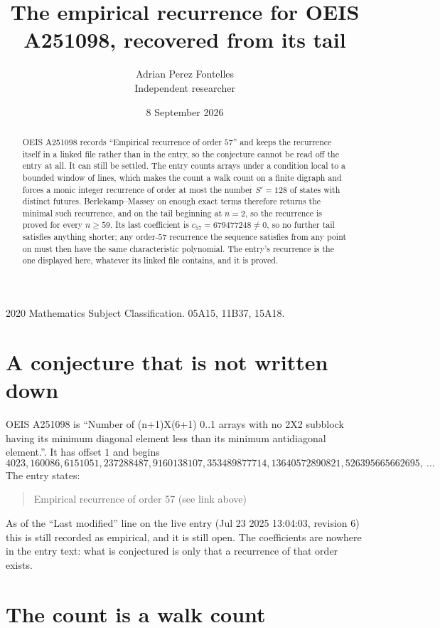 \documentclass[11pt,a4paper]{article}
\title{The empirical recurrence for OEIS A251098, recovered from its tail}
\author{Adrian Perez Fontelles\\ \small Independent researcher}
\date{8 September 2026}
\theoremstyle{plain}
\theoremstyle{definition}
\begin{document}
\maketitle

\begin{abstract}
OEIS A251098 records ``Empirical recurrence of order $57$'' and keeps the recurrence itself in
a linked file rather than in the entry, so the conjecture cannot be read off the entry at all.
It can still be settled. The entry counts arrays under a condition local to a bounded window of
lines, which makes the count a walk count on a finite digraph and forces a monic integer
recurrence of order at most the number $S'=128$ of states with distinct futures. Berlekamp--Massey on
enough exact terms therefore returns the minimal such recurrence, and on the tail beginning at $n=2$, so the recurrence is proved for every $n\ge59$.
Its last coefficient is $c_{57}=679477248\neq0$, so no further tail satisfies anything
shorter; any order-$57$ recurrence the sequence satisfies from any point on must then have
the same characteristic polynomial. The entry's recurrence is the one displayed here, whatever
its linked file contains, and it is proved.
\end{abstract}

\noindent\small 2020 Mathematics Subject Classification. 05A15, 11B37, 15A18.\normalsize

\section{A conjecture that is not written down}

OEIS A251098 is ``Number of (n+1)X(6+1) 0..1 arrays with no 2X2 subblock having its minimum diagonal element less than its minimum antidiagonal element.''. It has offset $1$ and begins
\[
4023, 160086, 6151051, 237288487, 9160138107, 353489877714, 13640572890821, 526395665662695,\ \dots
\]
The entry states:
\begin{quote}
Empirical recurrence of order 57 (see link above)
\end{quote}
As of the ``Last modified'' line on the live entry (Jul 23 2025 13:04:03, revision 6)
this is still recorded as empirical, and it is still open. The coefficients are nowhere in the
entry text: what is conjectured is only that a recurrence of that order exists.

\section{The count is a walk count}
\end{document}
